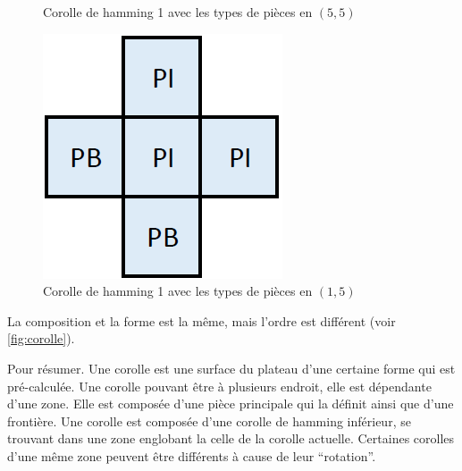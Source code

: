 \begin{exmp}
\begin{minipage}{0.24\textwidth}
\begin{figure}[H]
				\caption{Corolle de hamming 1 avec les types de pièces en $(5,5)$}
				\label{fig:corolle_zone_orientee_2}
			\end{figure}
		\end{minipage}\hfill
		\begin{minipage}{0.24\textwidth}
			\begin{figure}[H]
				\centering
				\includegraphics[width=\linewidth]{images/corolle_zone_orientee_3}
				\caption{Corolle de hamming 1 avec les types de pièces en $(1,5)$}
				\label{fig:corolle_zone_orientee_3}
			\end{figure}
		\end{minipage}\hfill
		
		La composition et la forme est la même, mais l'ordre est différent (voir \autoref{fig:corolle}).
	\end{exmp}
	
	Pour résumer. Une corolle est une surface du plateau d'une certaine forme qui est pré-calculée. Une corolle pouvant être à plusieurs endroit, elle est dépendante d'une zone. Elle est composée d'une pièce principale qui la définit ainsi que d'une frontière. Une corolle est composée d'une corolle de hamming inférieur, se trouvant dans une zone englobant la celle de la corolle actuelle. Certaines corolles d'une même zone peuvent être différents à cause de leur \enquote{rotation}.
	

